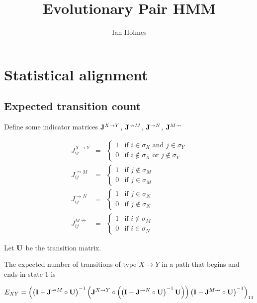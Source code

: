 \documentclass{article}
\title{Evolutionary Pair HMM}
\author{Ian Holmes}
\begin{document}

\section{Statistical alignment}

\subsection{Expected transition count}

Define some indicator matrices
${\bf J}^{X \to Y}$,
${\bf J}^{\nrightarrow M}$,
${\bf J}^{\rightarrow N}$,
${\bf J}^{M \nrightarrow}$

\begin{eqnarray*}
  J^{X \to Y}_{ij} & = & \left\{ \begin{array}{ll} 1 & \mbox{if $i \in \sigma_X$ and $j \in \sigma_Y$} \\ 0 & \mbox{if $i \notin \sigma_X$ or $j \notin \sigma_Y$} \end{array} \right. \\
  J^{\nrightarrow M}_{ij} & = & \left\{ \begin{array}{ll} 1 & \mbox{if $j \notin \sigma_M$} \\ 0 & \mbox{if $j \in \sigma_M$} \end{array} \right. \\
  J^{\rightarrow N}_{ij} & = & \left\{ \begin{array}{ll} 1 & \mbox{if $j \in \sigma_N$} \\ 0 & \mbox{if $j \notin \sigma_N$} \end{array} \right. \\
  J^{M \nrightarrow}_{ij} & = & \left\{ \begin{array}{ll} 1 & \mbox{if $i \notin \sigma_M$} \\ 0 & \mbox{if $i \in \sigma_N$} \end{array} \right.
\end{eqnarray*}

Let ${\bf U}$ be the transition matrix.

The expected number of transitions of type $X \to Y$
in a path that begins and ends in state 1
is

\[
E_{XY} =
\left(
\left( {\bf I} - {\bf J}^{\nrightarrow M} \circ {\bf U} \right)^{-1}
\left(
     {\bf J}^{X \to Y} \circ
     \left(
     \left( {\bf I} - {\bf J}^{\rightarrow N} \circ {\bf U} \right)^{-1}
          {\bf U}
     \right)
\right)
\left( {\bf I} - {\bf J}^{M \nrightarrow} \circ {\bf U} \right)^{-1}
\right)_{11}
\]
\end{document}
